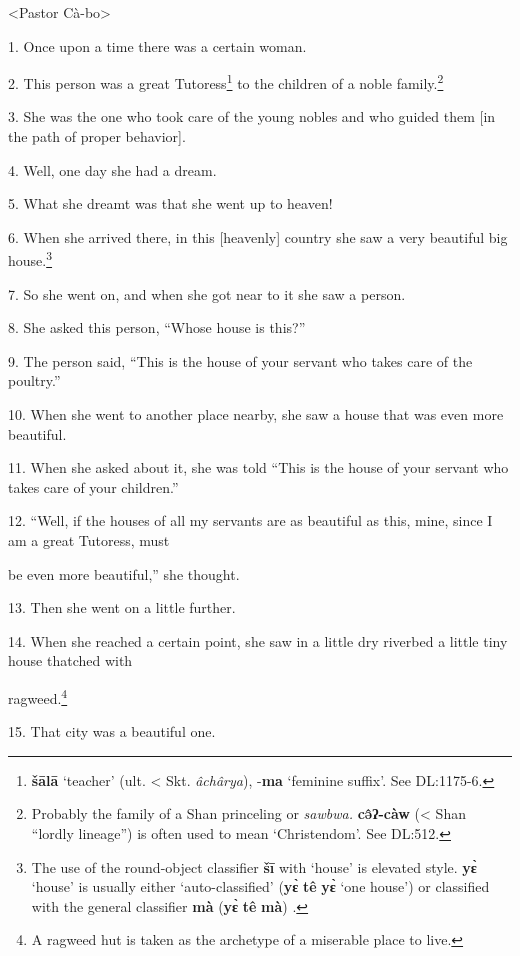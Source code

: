 \setcounter{footnote}{0}

<Pastor Cà-bo>

1. Once upon a time there was a certain woman.

2. This person was a great Tutoress\footnote{\textbf{šālā} `teacher' (ult. < Skt. \textit{âchârya}), -\textbf{ma} `feminine suffix'. See DL:1175-6.} to the children of a noble family.\footnote{Probably the family of a Shan princeling or \textit{sawbwa.} \textbf{cə̂ʔ-càw} (< Shan ``lordly lineage'') is often used to mean `Christendom'. See DL:512.}

3. She was the one who took care of the young nobles and who guided them [in the
path of proper behavior].

4. Well, one day she had a dream.

5. What she dreamt was that she went up to heaven!

6. When she arrived there, in this [heavenly] country she saw a very beautiful
big house.\footnote{The use of the round-object classifier \textbf{šī} with `house' is elevated style. \textbf{yɛ̀} `house' is usually either `auto-classified' (\textbf{yɛ̀} \textbf{tê} \textbf{yɛ̀} `one house') or classified with the general classifier \textbf{mà} (\textbf{yɛ̀} \textbf{tê} \textbf{mà}) .}

7. So she went on, and when she got near to it she saw a person.

8. She asked this person, ``Whose house is this?''

9. The person said, ``This is the house of your servant who takes care of the poultry.''

10. When she went to another place nearby, she saw a house that was even more beautiful.

11. When she asked about it, she was told ``This is the house of your servant who
takes care of your children.''

12. ``Well, if the houses of all my servants are as beautiful as this, mine, since
I am a great Tutoress, must

be even more beautiful,'' she thought.

13. Then she went on a little further.

14. When she reached a certain point, she saw in a little dry riverbed a little
tiny house thatched with

ragweed.\footnote{A ragweed hut is taken as the archetype of a miserable place to live.}

15. That city was a beautiful one.


